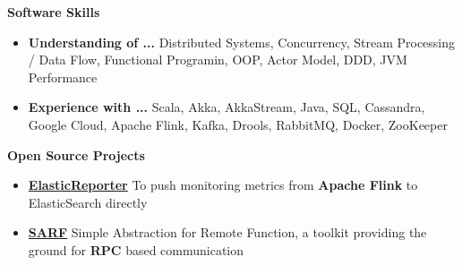 \documentclass[letterpaper,12pt]{article}[leftmargin=*]
\def \entryspacing {-0pt}
\renewcommand{\section}[2]{\vspace{5pt}
  \colorbox{secondary}{\color{white}\raggedbottom\normalsize\textbf{{#1}{\hspace{7pt}#2}}}
}
\newcommand{\resumeEntryStart}{\begin{itemize}[leftmargin=2.5mm]}
\newcommand{\resumeEntryEnd}{\end{itemize}\vspace{\entryspacing}}
\newcommand{\resumeEntryS}[2]{
  \item[]\small{
    \textbf{\color{primary}#1 }{ #2 \vspace{-6pt}}
  }
}
\begin{document}
\section{\faGears}{Software Skills}
	\resumeEntryStart
		\resumeEntryS{Understanding of ... } {Distributed Systems, Concurrency, Stream Processing / Data Flow, Functional Programin, OOP, Actor Model, DDD, JVM Performance}
		\resumeEntryS{Experience with ... } {Scala, Akka, AkkaStream, Java, SQL, Cassandra, Google Cloud, Apache Flink, Kafka, Drools, RabbitMQ, Docker, ZooKeeper}
	\resumeEntryEnd

\section{\faGears}{Open Source Projects}
	\resumeEntryStart
		\resumeEntryS{\href{https://github.com/sameei/elasticreporter}{ElasticReporter}} {To push monitoring metrics from \textbf{Apache Flink} to ElasticSearch directly}
		\resumeEntryS{\href{https://github.com/sameei/SARF}{SARF}} {Simple Abstraction for Remote Function, a toolkit providing the ground for \textbf{RPC} based communication}
	\resumeEntryEnd
  
\end{document}
